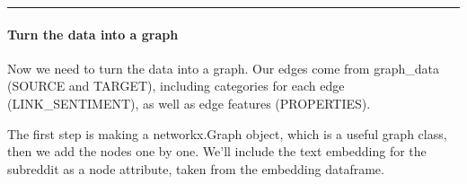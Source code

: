 \documentclass[letterpaper,10pt,english]{sphinxhowto}
\begin{document}
\bigskip\hrule\bigskip



\paragraph{Turn the data into a graph}
\label{\detokenize{reddit-dataset-example:Turn-the-data-into-a-graph}}
\sphinxAtStartPar
Now we need to turn the data into a graph. Our edges come from graph\_data (SOURCE and TARGET), including categories for each edge (LINK\_SENTIMENT), as well as edge features (PROPERTIES).

\sphinxAtStartPar
The first step is making a networkx.Graph object, which is a useful graph class, then we add the nodes one by one. We’ll include the text embedding for the subreddit as a node attribute, taken from the embedding dataframe.
\end{document}
